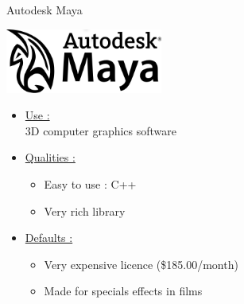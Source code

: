 \documentclass[a4paper,10pt]{beamer}
\begin{document}
			\begin{frame}{Autodesk Maya}
				\begin{multicols}{2}
					\includegraphics[height=60pt]{images/logos/Autodesk_Maya.png}\\
					
					\columnbreak 
					
					\begin{itemize}
						\item \underline{Use :}\\		
						3D computer graphics software		
						\item \underline{Qualities :}\\
						\begin{itemize}
							\item Easy to use : C++
							\item Very rich library
						\end{itemize}
					\end{itemize}		 
				\end{multicols}
				\begin{itemize}
					\item \underline{Defaults :}\\
					\begin{itemize}
						\item Very expensive licence (\$185.00/month)
						\item Made for specials effects in films
					\end{itemize}
				\end{itemize}
			\end{frame}
		
\end{document}
